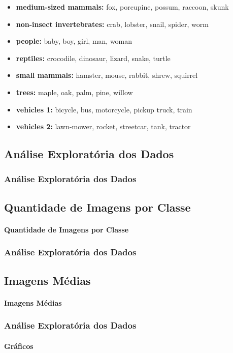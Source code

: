 \documentclass{beamer}
\begin{document}
\begin{frame}
\begin{itemize}
    \item \textbf{medium-sized mammals:} 	fox, porcupine, possum, raccoon, skunk
    \item \textbf{non-insect invertebrates:} 	crab, lobster, snail, spider, worm
    \item \textbf{people:} 	baby, boy, girl, man, woman
    \item \textbf{reptiles:} 	crocodile, dinosaur, lizard, snake, turtle
    \item \textbf{small mammals:} 	hamster, mouse, rabbit, shrew, squirrel
    \item \textbf{trees:} 	maple, oak, palm, pine, willow
    \item \textbf{vehicles 1:} 	bicycle, bus, motorcycle, pickup truck, train
    \item \textbf{vehicles 2:}	lawn-mower, rocket, streetcar, tank, tractor

\end{itemize}  
\end{frame}

\begin{frame}
\section{Análise Exploratória dos Dados}
\frametitle{Análise Exploratória dos Dados}
\subsection{Quantidade de Imagens por Classe}
\framesubtitle{Quantidade de Imagens por Classe} 

\end{frame}
    
\begin{frame}
\frametitle{Análise Exploratória dos Dados}
\subsection{Imagens Médias}
\framesubtitle{Imagens Médias}

\end{frame}


\begin{frame}
\frametitle{Análise Exploratória dos Dados}
\framesubtitle{Gráficos}



      
\end{frame}
\end{document}
